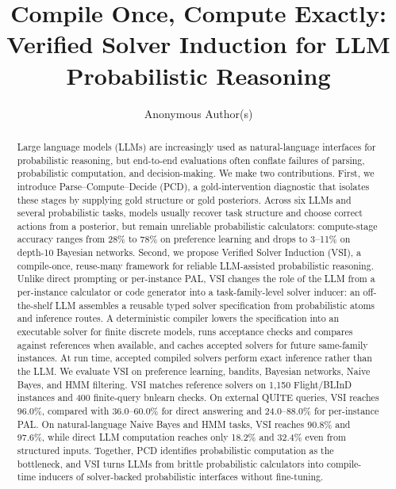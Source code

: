 \documentclass{article}
\title{Compile Once, Compute Exactly: Verified Solver Induction for LLM Probabilistic Reasoning}
\author{Anonymous Author(s)}
\begin{document}
\maketitle

\begin{abstract}
Large language models (LLMs) are increasingly used as natural-language interfaces for probabilistic reasoning, but end-to-end evaluations often conflate failures of parsing, probabilistic computation, and decision-making.
We make two contributions.
First, we introduce Parse--Compute--Decide (PCD), a gold-intervention diagnostic that isolates these stages by supplying gold structure or gold posteriors.
Across six LLMs and several probabilistic tasks, models usually recover task structure and choose correct actions from a posterior, but remain unreliable probabilistic calculators: compute-stage accuracy ranges from 28\% to 78\% on preference learning and drops to 3--11\% on depth-10 Bayesian networks.
Second, we propose Verified Solver Induction (VSI), a compile-once, reuse-many framework for reliable LLM-assisted probabilistic reasoning.
Unlike direct prompting or per-instance PAL, VSI changes the role of the LLM from a per-instance calculator or code generator into a task-family-level solver inducer: an off-the-shelf LLM assembles a reusable typed solver specification from probabilistic atoms and inference routes.
A deterministic compiler lowers the specification into an executable solver for finite discrete models, runs acceptance checks and compares against references when available, and caches accepted solvers for future same-family instances.
At run time, accepted compiled solvers perform exact inference rather than the LLM.
We evaluate VSI on preference learning, bandits, Bayesian networks, Naive Bayes, and HMM filtering.
VSI matches reference solvers on 1,150 Flight/BLInD instances and 400 finite-query bnlearn checks.
On external QUITE queries, VSI reaches 96.0\%, compared with 36.0--60.0\% for direct answering and 24.0--88.0\% for per-instance PAL.
On natural-language Naive Bayes and HMM tasks, VSI reaches 90.8\% and 97.6\%, while direct LLM computation reaches only 18.2\% and 32.4\% even from structured inputs.
Together, PCD identifies probabilistic computation as the bottleneck, and VSI turns LLMs from brittle probabilistic calculators into compile-time inducers of solver-backed probabilistic interfaces without fine-tuning.
\end{abstract}
\end{document}
